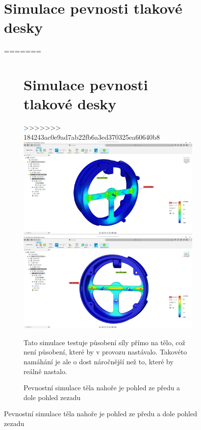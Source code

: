 \begin{figure}
\section{Simulace pevnosti tlakové desky}
    \vspace{\OdsazeniNadpisu}
=======
\begin{figure}
    \section{Simulace pevnosti tlakové desky}
>>>>>>> 184243ac0e9ad7ab22fb6a3ed370325ea60640b8
    \centering
    \includegraphics[width=370pt]{kapitoly/obrazky/E4/machanika_tlakove_desky/simulace/F100N,primo,uprostred,pohled_zepredu.png}
    \includegraphics[width=370pt]{kapitoly/obrazky/E4/machanika_tlakove_desky/simulace/F100N,primo,uprostred,pohled_zezadu.png}
    \caption{Pevnostní simulace těla nahoře je pohled ze předu a dole pohled zezadu \centering}
    Tato simulace testuje působení síly přímo na tělo, což není působení, které by v provozu nastávalo. Takovéto namáhání je ale o dost náročnější
    než to, které by reálně nastalo.
    \label{fig:E4-simulace_tela} %
\end{figure}


\end{figure}
